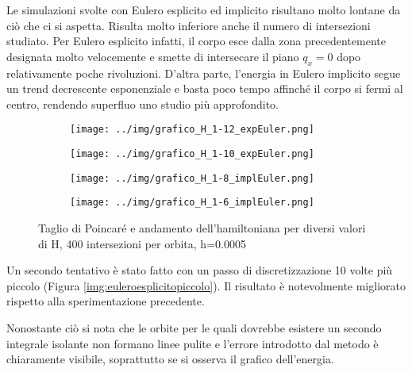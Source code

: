 \documentclass[a4paper, 12pt]{article}
\numberwithin{equation}{section}
\numberwithin{figure}{section}
\begin{document}
Le simulazioni svolte con Eulero esplicito ed implicito risultano molto lontane da ciò che ci
si aspetta. Risulta molto inferiore anche il numero di intersezioni studiato.
Per Eulero esplicito infatti, il corpo esce dalla zona precedentemente designata molto velocemente
e smette di intersecare il piano $q_x=0$ dopo relativamente poche rivoluzioni. D'altra parte,
l'energia in Eulero implicito segue un trend decrescente esponenziale e basta poco tempo affinché
il corpo si fermi al centro, rendendo superfluo uno studio più approfondito.
\clearpage
\begin{figure}[h!]
	\centering
	\begin{subfigure}[t]{.49\textwidth}
		\centering
		\texttt{[image: ../img/grafico\_H\_1-12\_expEuler.png]}
	\end{subfigure}
	\begin{subfigure}[t]{.49\textwidth}
		\centering
		\texttt{[image: ../img/grafico\_H\_1-10\_expEuler.png]}
	\end{subfigure}
	\begin{subfigure}[t]{.49\textwidth}
		\centering
		\texttt{[image: ../img/grafico\_H\_1-8\_implEuler.png]}
	\end{subfigure}
	\begin{subfigure}[t]{.49\textwidth}
		\centering
		\texttt{[image: ../img/grafico\_H\_1-6\_implEuler.png]}
	\end{subfigure}

	\caption{Taglio di Poincaré e andamento dell'hamiltoniana per diversi valori di H,
	400 intersezioni per orbita, h=0.0005}
\end{figure}

Un secondo tentativo è stato fatto con un passo di discretizzazione 10 volte più piccolo
(Figura \ref{img:euleroesplicitopiccolo}). Il risultato è notevolmente migliorato rispetto
alla sperimentazione precedente.

Nonostante ciò si nota che le orbite per le quali dovrebbe esistere un secondo integrale
isolante non formano linee pulite e l'errore introdotto dal metodo è chiaramente visibile,
soprattutto se si osserva il grafico dell'energia.
\end{document}
